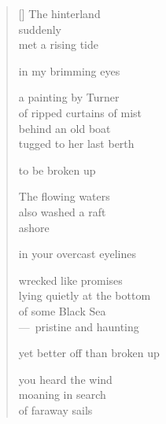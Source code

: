 \documentclass[12pt,a4paper]{article}
\begin{document}
\thispagestyle{empty}

\poemtitle{}

\settowidth{\versewidth}{yet better off than broken up}

\bigskip

\begin{verse}[\versewidth]
The hinterland \\
suddenly \\
met a rising tide

in my brimming eyes

a painting by Turner \\
of ripped curtains of mist \\
behind an old boat \\
tugged to her last berth

to be broken up

The flowing waters \\
also washed a raft \\
ashore

in your overcast eyelines

wrecked like promises \\
lying quietly at the bottom \\
of some Black Sea \\
---~pristine and haunting

yet better off than broken up

you heard the wind \\
moaning in search \\
of faraway sails
\end{verse}
\end{document}
